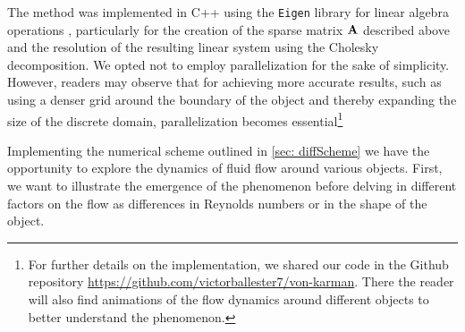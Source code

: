 The method was implemented in C++ using the \texttt{Eigen} library for linear algebra operations \cite{eigen}, particularly for the creation of the sparse matrix $\boldsymbol{\mathrm{A}}$ described above and the resolution of the resulting linear system using the Cholesky decomposition. We opted not to employ parallelization for the sake of simplicity. However, readers may observe that for achieving more accurate results, such as using a denser grid around the boundary of the object and thereby expanding the size of the discrete domain, parallelization becomes essential\footnote{For further details on the implementation, we shared our code in the Github repository \href{https://github.com/victorballester7/von-karman}{https://github.com/victorballester7/von-karman}. There the reader will also find animations of the flow dynamics around different objects to better understand the phenomenon.}

Implementing the numerical scheme outlined in \cref{sec: diffScheme} we have the opportunity to explore the dynamics of fluid flow around various objects. First, we want to illustrate the emergence of the phenomenon before delving in different factors on the flow as differences in Reynolds numbers or in the shape of the object.

